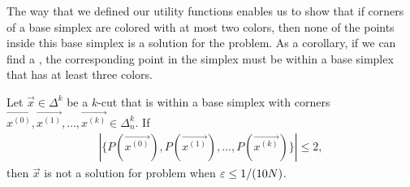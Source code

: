 The way that we defined our utility functions enables us to show that if corners of a base simplex are colored with at most two colors, then none of the points inside this base simplex is a solution for the \mccs{} problem. As a corollary, if we can find a \mccs{}, the corresponding point in the simplex must be within a base simplex that has at least three colors.



\begin{lemma}\label{lem:envy-free-colors-base}
    Let $\vec{x} \in \Delta^k $ be a $k$-cut that is within a base simplex with corners $\vec{x^{(0)}}, \vec{x^{(1)}}, \ldots, \vec{x^{(k)}} \in \Delta^k_n$. If \begin{align*}
        \left|\{P(\vec{x^{(0)}}), P(\vec{x^{(1)}}), \ldots, P(\vec{x^{(k)}})\}\right| \leq 2,
    \end{align*} 
    then $\vec{x}$ is not a solution for \mccs{} problem when $\varepsilon \leq 1/(10N)$.
\end{lemma}

